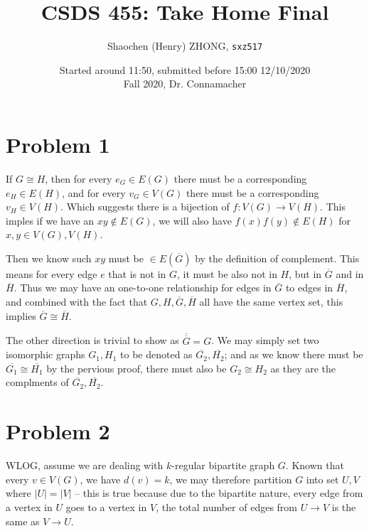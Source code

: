 \documentclass[11pt]{article}
\newcommand{\ilc}{\texttt}
\begin{document}
\title{\textbf{CSDS 455: Take Home Final}}

\author{Shaochen (Henry) ZHONG, \ilc{sxz517}}
\date{Started around 11:50, submitted before 15:00 12/10/2020 \\ Fall 2020, Dr. Connamacher}
\maketitle



\section*{Problem 1}

If $G \cong H$, then for every $e_G \in E(G)$ there must be a corresponding $e_H \in E(H)$, and for every $v_G \in V(G)$ there must be a corresponding $v_H \in V(H)$. Which suggests there is a bijection of $f: V(G) \rightarrow V(H)$. This imples if we have an $xy \not \in E(G)$, we will also have $f(x)f(y) \not \in E(H)$ for $x, y \in V(G), V(H)$.

Then we know such $xy$ must be $\in E(\overline{G})$ by the definition of complement. This means for every edge $e$ that is not in $G$, it must be also not in $H$, but in $\overline{G}$ and in $\overline{H}$. Thus we may have an one-to-one relationship for edges in $\overline{G}$ to edges in $\overline{H}$, and combined with the fact that $G, H, \overline{G}, \overline{H}$ all have the same vertex set, this implies $\overline{G} \cong \overline{H}$.\newline

The other direction is trivial to show as $\overline{\overline{G}} = G$. We may simply set two isomorphic graphs $G_1, H_1$ to be denoted as $\overline{G_2}, \overline{H_2}$; and as we know there must be $\overline{G_1} \cong \overline{H_1}$ by the pervious proof, there must also be $G_2 \cong H_2$ as they are the complments of $\overline{G_2}, \overline{H_2}$.

\section*{Problem 2}

WLOG, assume we are dealing with $k$-regular bipartite graph $G$. Known that every $v \in V(G)$, we have $d(v) = k$, we may therefore partition $G$ into set $U, V$ where $|U| = |V|$ -- this is true because due to the bipartite nature, every edge from a vertex in $U$ goes to a vertex in $V$, the total number of edges from $U \rightarrow V$  is the same as $V \rightarrow U$.
\end{document}
